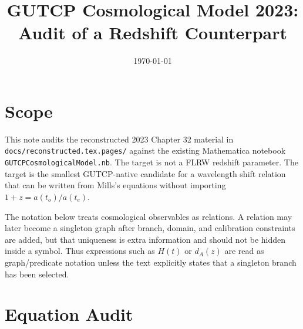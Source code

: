 \documentclass[11pt]{article}
\title{GUTCP Cosmological Model 2023: Audit of a Redshift Counterpart}
\author{}
\date{\today}
\begin{document}
\maketitle

\section*{Scope}

This note audits the reconstructed 2023 Chapter 32 material in
\texttt{docs/reconstructed.tex.pages/} against the existing Mathematica notebook
\texttt{GUTCPCosmologicalModel.nb}.  The target is not a FLRW redshift
parameter.  The target is the smallest GUTCP-native candidate for a wavelength
shift relation that can be written from Mills's equations without importing
\(1+z=a(t_o)/a(t_e)\).

The notation below treats cosmological observables as relations.  A relation
may later become a singleton graph after branch, domain, and calibration
constraints are added, but that uniqueness is extra information and should not
be hidden inside a symbol.  Thus expressions such as \(H(t)\) or \(d_A(z)\)
are read as graph/predicate notation unless the text explicitly states that a
singleton branch has been selected.

\section*{Equation Audit}
\end{document}
